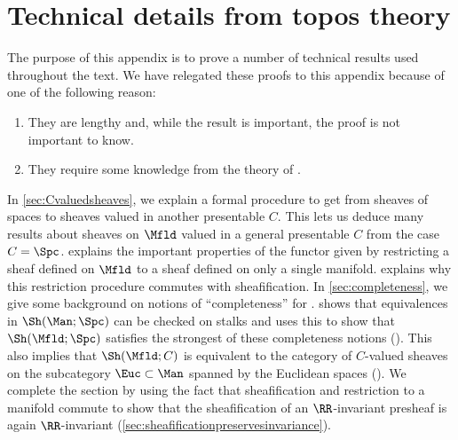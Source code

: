 

\section{Technical details from topos theory}\label{app:technicaldeatails}

The purpose of this appendix is to prove a number of technical results used throughout the text.
We have relegated these proofs to this appendix because of one of the following reason:
\begin{enumerate}[(1)]
	\item They are lengthy and, while the result is important, the proof is not important to know.

	\item They require some knowledge from the theory of \topoi.
\end{enumerate}
In \cref{sec:Cvaluedsheaves}, we explain a formal procedure to get from sheaves of spaces to sheaves valued in another presentable \category $ C $.
This lets us deduce many results about sheaves on $ \Mfld $ valued in a general presentable \category $ C $ from the case $ C = \Spc $.
 explains the important properties of the functor given by restricting a sheaf defined on $ \Mfld $ to a sheaf defined on only a single manifold.
 explains why this restriction procedure commutes with sheafification.
In \cref{sec:completeness}, we give some background on notions of ``completeness'' for \topoi.
 shows that equivalences in $ \Sh(\Man;\Spc) $ can be checked on stalks and uses this to show that $ \Sh(\Mfld;\Spc) $ satisfies the strongest of these completeness notions ().
This also implies that $ \Sh(\Mfld;C) $ is equivalent to the category of $ C $-valued sheaves on the subcategory $ \Euc \subset \Man $ spanned by the Euclidean spaces ().
We complete the section by using the fact that sheafification and restriction to a manifold commute to show that the sheafification of an $ \RR $-invariant presheaf is again $ \RR $-invariant (\cref{sec:sheafificationpreservesinvariance}).

